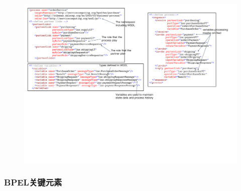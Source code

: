 \begin{figure}[H]
    \vspace{-0.5em}
	\centering
	\includegraphics[width=\textwidth]{images/创建业务过程2.pdf}
    \vspace{-3em}
\end{figure}

\subsubsection{BPEL关键元素}

\vspace{-0.5em}
\begin{spacing}{1.2}
    \centering
    
\end{spacing}
\vspace{-1em}